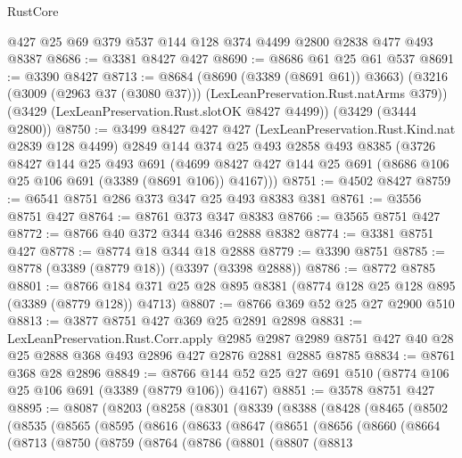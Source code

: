 \begin{lexlean}{RustCore}
\begin{coremodule}
    @427
    @25
    @69
    @379
    @537
    @144
    @128
    @374
    @4499
    @2800
    @2838
    @477
    @493
    @8387
@8686 := @3381 @8427 @427
@8690 := @8686 @61 @25 @61 @537
@8691 := @3390 @8427
@8713 := @8684
    (@8690 (@3389 (@8691 @61)) @3663)
    (@3216 (@3009 (@2963 @37 (@3080 @37))) (LexLeanPreservation.Rust.natArms @379))
    (@3429 (LexLeanPreservation.Rust.slotOK @8427 @4499))
    (@3429 (@3444 @2800))
@8750 := @3499
    @8427
    @427
    @427
    (LexLeanPreservation.Rust.Kind.nat @2839 @128 @4499)
    @2849
    @144
    @374
    @25
    @493
    @2858
    @493
    @8385
    (@3726
      @8427
      @144
      @25
      @493
      @691
      (@4699 @8427 @427 @144 @25 @691 (@8686 @106 @25 @106 @691 (@3389 (@8691 @106)) @4167)))
@8751 := @4502 @8427
@8759 := @6541 @8751 @286 @373 @347 @25 @493 @8383 @381
@8761 := @3556 @8751 @427
@8764 := @8761 @373 @347 @8383
@8766 := @3565 @8751 @427
@8772 := @8766 @40 @372 @344 @346 @2888 @8382
@8774 := @3381 @8751 @427
@8778 := @8774 @18 @344 @18 @2888
@8779 := @3390 @8751
@8785 := @8778 (@3389 (@8779 @18)) (@3397 (@3398 @2888))
@8786 := @8772 @8785
@8801 := @8766 @184 @371 @25 @28 @895 @8381 (@8774 @128 @25 @128 @895 (@3389 (@8779 @128)) @4713)
@8807 := @8766 @369 @52 @25 @27 @2900 @510
@8813 := @3877 @8751 @427 @369 @25 @2891 @2898
@8831 := LexLeanPreservation.Rust.Corr.apply
    @2985
    @2987
    @2989
    @8751
    @427
    @40
    @28
    @25
    @2888
    @368
    @493
    @2896
    @427
    @2876
    @2881
    @2885
    @8785
@8834 := @8761 @368 @28 @2896
@8849 := @8766 @144 @52 @25 @27 @691 @510 (@8774 @106 @25 @106 @691 (@3389 (@8779 @106)) @4167)
@8851 := @3578 @8751 @427
@8895 := @8087
    (@8203
      (@8258
        (@8301
          (@8339
            (@8388
              (@8428
                (@8465
                  (@8502
                    (@8535
                      (@8565
                        (@8595
                          (@8616
                            (@8633
                              (@8647
                                (@8651
                                  (@8656
                                    (@8660
                                      (@8664
                                        (@8713
                                          (@8750
                                            (@8759
                                              (@8764
                                                (@8786
                                                  (@8801
                                                    (@8807
                                                      (@8813

\end{coremodule}
\end{lexlean}
